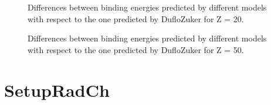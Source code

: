 \documentclass[letterpaper,10pt,english]{sphinxmanual}
\begin{document}
\begin{figure}[htbp]
\centering
\capstart

\noindent{}
\caption{Differences between binding energies predicted by different models with respect to the one predicted by Duflo\sphinxhyphen{}Zuker for Z = 20.}\label{\detokenize{source/api/setup_masses_theory:id1}}\end{figure}

\begin{figure}[htbp]
\centering
\capstart

\noindent{}
\caption{Differences between binding energies predicted by different models with respect to the one predicted by Duflo\sphinxhyphen{}Zuker for Z = 50.}\label{\detokenize{source/api/setup_masses_theory:id2}}\end{figure}

\sphinxstepscope


\section{SetupRadCh}
\label{\detokenize{source/api/setup_rad_ch:setupradch}}\label{\detokenize{source/api/setup_rad_ch::doc}}\label{\detokenize{source/api/setup_rad_ch:module-nucleardatapy.setup_rad_ch}}
\end{document}
